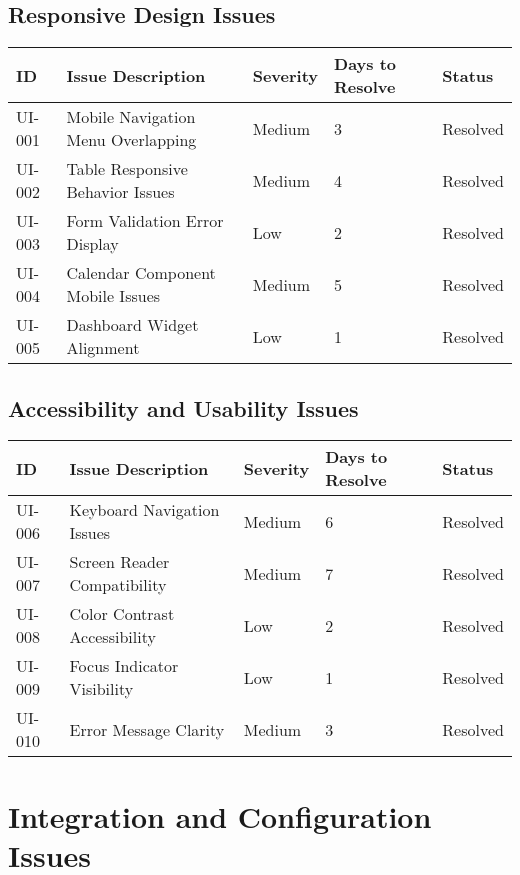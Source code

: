 \documentclass[12pt,a4paper]{article}
\begin{document}
\subsection{Responsive Design Issues}

\begin{longtable}{|p{1cm}|p{5cm}|p{2cm}|p{2cm}|p{2cm}|}
\hline
\textbf{ID} & \textbf{Issue Description} & \textbf{Severity} & \textbf{Days to Resolve} & \textbf{Status} \\
\hline
UI-001 & Mobile Navigation Menu Overlapping & Medium & 3 & \cellcolor{green!30}Resolved \\
\hline
UI-002 & Table Responsive Behavior Issues & Medium & 4 & \cellcolor{green!30}Resolved \\
\hline
UI-003 & Form Validation Error Display & Low & 2 & \cellcolor{green!30}Resolved \\
\hline
UI-004 & Calendar Component Mobile Issues & Medium & 5 & \cellcolor{green!30}Resolved \\
\hline
UI-005 & Dashboard Widget Alignment & Low & 1 & \cellcolor{green!30}Resolved \\
\hline
\end{longtable}

\subsection{Accessibility and Usability Issues}

\begin{longtable}{|p{1cm}|p{5cm}|p{2cm}|p{2cm}|p{2cm}|}
\hline
\textbf{ID} & \textbf{Issue Description} & \textbf{Severity} & \textbf{Days to Resolve} & \textbf{Status} \\
\hline
UI-006 & Keyboard Navigation Issues & Medium & 6 & \cellcolor{green!30}Resolved \\
\hline
UI-007 & Screen Reader Compatibility & Medium & 7 & \cellcolor{green!30}Resolved \\
\hline
UI-008 & Color Contrast Accessibility & Low & 2 & \cellcolor{green!30}Resolved \\
\hline
UI-009 & Focus Indicator Visibility & Low & 1 & \cellcolor{green!30}Resolved \\
\hline
UI-010 & Error Message Clarity & Medium & 3 & \cellcolor{green!30}Resolved \\
\hline
\end{longtable}

\section{Integration and Configuration Issues}
\end{document}
